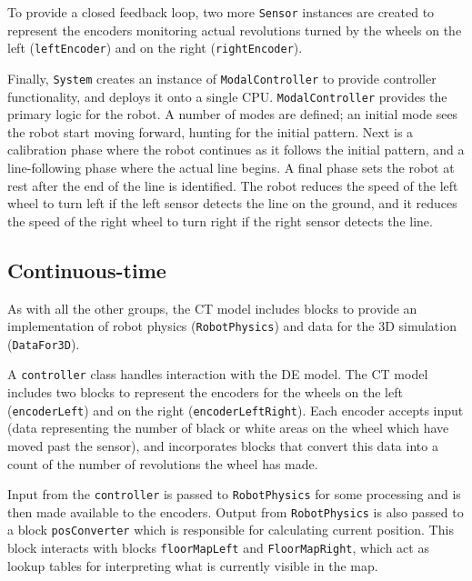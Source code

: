 To provide a closed feedback loop, two more \texttt{Sensor} instances
are created to represent the encoders monitoring actual revolutions
turned by the wheels on the left (\texttt{leftEncoder}) and on the
right (\texttt{rightEncoder}).

Finally, \texttt{System} creates an instance of
\texttt{ModalController} to provide controller functionality, and
deploys it onto a single CPU.  \texttt{ModalController} provides the
primary logic for the robot.  A number of modes are defined; an
initial mode sees the robot start moving forward, hunting for the
initial pattern.  Next is a calibration phase where the robot
continues as it follows the initial pattern, and a line-following
phase where the actual line begins.  A final phase sets the robot at
rest after the end of the line is identified.  The robot reduces the
speed of the left wheel to turn left if the left sensor detects the
line on the ground, and it reduces the speed of the right wheel to
turn right if the right sensor detects the line.

\subsection{Continuous-time}
As with all the other groups, the CT model includes blocks to provide
an implementation of robot physics (\texttt{RobotPhysics}) and data
for the 3D simulation (\texttt{DataFor3D}).

A \texttt{controller} class handles interaction with the DE model.
The CT model includes two blocks to represent the encoders for the
wheels on the left (\texttt{encoderLeft}) and on the right
(\texttt{encoderLeftRight}). Each encoder accepts input (data representing
the number of black or white areas on the wheel which have moved past
the sensor), and incorporates blocks that convert this data into a
count of the number of revolutions the wheel has made.

Input from the \texttt{controller} is passed to \texttt{RobotPhysics}
for some processing and is then made available to the encoders.
Output from \texttt{RobotPhysics} is also passed to a block
\texttt{pos\-Con\-ver\-ter} which is responsible for calculating current
position.  This block interacts with blocks \texttt{floorMapLeft} and
\texttt{FloorMapRight}, which act as lookup tables for interpreting what is
currently visible in the map.





